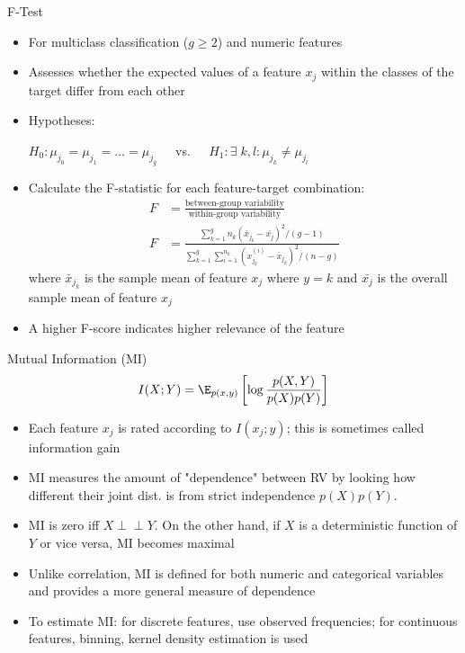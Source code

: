 \documentclass[11pt,compress,t,notes=noshow, xcolor=table]{beamer}
\begin{document}
  \begin{frame2}{F-Test}
  \begin{itemize}
    \item For multiclass classification ($g \ge 2$) and numeric features
    \item Assesses whether the expected values of a feature $x_j$ within the classes of the target differ from each other
    \item Hypotheses:

    $H_0: \mu_{j_0} = \mu_{j_1} = \dots = \mu_{j_g} \;\;\;\;$ vs. $\;\;\;\;H_1 : \exists \; k,l: \mu_{j_k} \neq \mu_{j_l}$
    \item Calculate the F-statistic for each feature-target combination:
    \begin{align*}
    F &= \frac{\text{between-group variability}}{\text{within-group variability}}\\
    F &= \frac{\sum_{k = 1}^g n_k (\bar{x}_{j_k} - \bar{x_j})^2/(g-1)}{\sum_{k = 1}^g \sum_{i = 1}^{n_k} (x_{j_k}^{(i)} - \bar{x}_{j_k})^2/(n-g)}
    \end{align*}
    where $\bar{x}_{j_k}$ is the sample mean of feature $x_j$ where $y = k$ and $\bar{x_{j}}$ is the overall sample mean of feature $x_j$
  \item A higher F-score indicates higher relevance of the feature
  \end{itemize}
  \end{frame2}

  \begin{frame2}{Mutual Information (MI)}
  $$I(X ; Y) = \E_{p(x, y)} \left[ \log \frac{p(X, Y)}{p(X) p(Y)} \right]$$

  \begin{itemize}
  \setlength{\itemsep}{0.8em}
    \item Each feature $x_j$ is rated according to $I(x_j;y)$; this is sometimes called information gain
    \item MI measures the amount of "dependence" between RV by looking how
    different their joint dist. is from strict independence $p(X)p(Y)$.
    \item MI is zero iff $X \perp \!\!\! \perp Y$. On the other hand, if $X$ is a deterministic function of $Y$ or vice versa, MI becomes maximal
  \item Unlike correlation, MI is defined for both numeric and categorical variables and provides a more general measure of dependence
  \item To estimate MI: for discrete features, use observed frequencies; for continuous features, binning, kernel density estimation is used
  \end{itemize}
  \end{frame2}

  \endlecture
\end{document}
